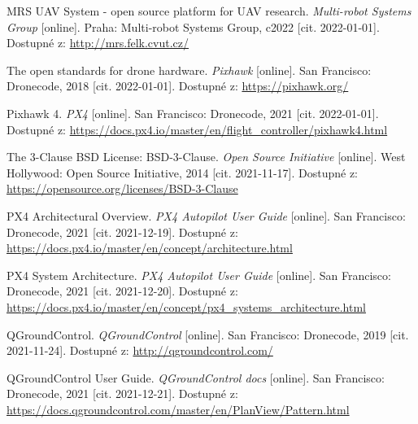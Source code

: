 

\begin{thebibliography}{99}

MRS UAV System - open source platform for UAV research. \textit{Multi-robot Systems Group} [online]. Praha: Multi-robot Systems Group, c2022 [cit. 2022-01-01]. Dostupné z: \href{http://mrs.felk.cvut.cz/}{http://mrs.felk.cvut.cz/}

The open standards for drone hardware. \textit{Pixhawk} [online]. San Francisco: Dronecode, 2018 [cit. 2022-01-01]. Dostupné z: \href{https://pixhawk.org/}{https://pixhawk.org/}

Pixhawk 4. \textit{PX4} [online]. San Francisco: Dronecode, 2021 [cit. 2022-01-01]. Dostupné z: \href{https://docs.px4.io/master/en/flight\_controller/pixhawk4.html}{https://docs.px4.io/master/en/flight\_controller/pixhawk4.html}

The 3-Clause BSD License: BSD-3-Clause. \textit{Open Source Initiative} [online]. West Hollywood: Open Source Initiative, 2014 [cit. 2021-11-17]. Dostupné z: \href{https://opensource.org/licenses/BSD-3-Clause}{https://opensource.org/licenses/BSD-3-Clause}

PX4 Architectural Overview. \textit{PX4 Autopilot User Guide} [online]. San Francisco: Dronecode, 2021 [cit. 2021-12-19]. Dostupné z: \href{https://docs.px4.io/master/en/concept/architecture.html}{https://docs.px4.io/master/en/concept/architecture.html}

PX4 System Architecture. \textit{PX4 Autopilot User Guide} [online]. San Francisco: Dronecode, 2021 [cit. 2021-12-20]. Dostupné z: \href{https://docs.px4.io/master/en/concept/px4\_systems\_architecture.html}{https://docs.px4.io/master/en/concept/px4\_systems\_architecture.html}

QGroundControl. \textit{QGroundControl} [online]. San Francisco: Dronecode, 2019 [cit. 2021-11-24]. Dostupné z: \href{http://qgroundcontrol.com/}{http://qgroundcontrol.com/}

QGroundControl User Guide. \textit{QGroundControl docs} [online]. San Francisco: Dronecode, 2021 [cit. 2021-12-21]. Dostupné z: \href{https://docs.qgroundcontrol.com/master/en/PlanView/Pattern.html}{https://docs.qgroundcontrol.com/master/en/PlanView/Pattern.html}


\end{thebibliography}
